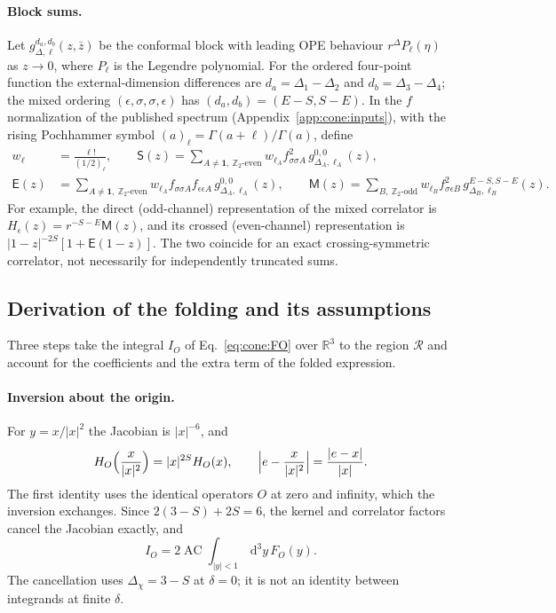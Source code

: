 \documentclass[11pt,a4paper]{article}
\numberwithin{equation}{section}
\newcommand{\dd}{\,\mathrm d}
\newcommand{\AC}{\operatorname{AC}}
\begin{document}
\paragraph{Block sums.} Let $g_{\Delta,\ell}^{d_a,d_b}(z,\bar z)$ be the conformal block with leading OPE behaviour
$r^\Delta P_\ell(\eta)$ as $z\to0$, where $P_\ell$ is the Legendre polynomial. For the ordered four-point function the
external-dimension differences are $d_a=\Delta_1-\Delta_2$ and $d_b=\Delta_3-\Delta_4$; the mixed ordering
$(\epsilon,\sigma,\sigma,\epsilon)$ has $(d_a,d_b)=(E-S,S-E)$. In the $f$ normalization of the published spectrum
(Appendix~\ref{app:cone:inputs}), with the rising Pochhammer symbol $(a)_\ell=\Gamma(a+\ell)/\Gamma(a)$, define
\begin{equation}
\begin{aligned}
 w_\ell&=\frac{\ell!}{(1/2)_\ell},\qquad
 \mathsf S(z)=\sum_{A\ne\mathbf 1,\ \mathbb Z_2\text{-even}}w_{\ell_A}f_{\sigma\sigma A}^2\,g_{\Delta_A,\ell_A}^{0,0}(z),\\
 \mathsf E(z)&=\sum_{A\ne\mathbf 1,\ \mathbb Z_2\text{-even}}w_{\ell_A}f_{\sigma\sigma A}f_{\epsilon\epsilon A}\,
 g_{\Delta_A,\ell_A}^{0,0}(z),\qquad
 \mathsf M(z)=\sum_{B,\ \mathbb Z_2\text{-odd}}w_{\ell_B}f_{\sigma\epsilon B}^2\,g_{\Delta_B,\ell_B}^{E-S,S-E}(z).
\end{aligned}
 \label{eq:cone:sums}
\end{equation}
For example, the direct (odd-channel) representation of the mixed correlator is $H_\epsilon(z)=r^{-S-E}\mathsf M(z)$,
and its crossed (even-channel) representation is $|1-z|^{-2S}[1+\mathsf E(1-z)]$. The two coincide for an exact
crossing-symmetric correlator, not necessarily for independently truncated sums.

\subsection{Derivation of the folding and its assumptions}\label{app:cone:folding}
Three steps take the integral $I_O$ of Eq.~\eqref{eq:cone:FO} over $\mathbb R^3$ to the region $\mathcal R$ and account
for the coefficients and the extra term of the folded expression.

\paragraph{Inversion about the origin.} For $y=x/|x|^2$ the Jacobian is $|x|^{-6}$, and
\begin{equation}
 H_O\Bigl(\frac{x}{|x|^2}\Bigr)=|x|^{2S}H_O(x),\qquad \Bigl|e-\frac{x}{|x|^2}\Bigr|=\frac{|e-x|}{|x|}.
\end{equation}
The first identity uses the identical operators $O$ at zero and infinity, which the inversion exchanges. Since
$2(3-S)+2S=6$, the kernel and correlator factors cancel the Jacobian exactly, and
\begin{equation}
 I_O=2\AC\!\int_{|y|<1}\dd^3y\,F_O(y).
 \label{eq:cone:foldorigin}
\end{equation}
The cancellation uses $\Delta_\chi=3-S$ at $\delta=0$; it is not an identity between integrands at finite $\delta$.
\end{document}
